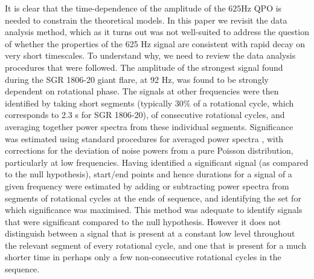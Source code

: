 \documentclass{emulateapj}
\begin{document}
It is clear that the time-dependence of the amplitude of the $625$Hz QPO is needed
to constrain the theoretical models.
In this paper we  revisit the data analysis method, which as it turns out was not well-suited to address the question of whether the properties of the 625 Hz signal are consistent with rapid decay on very short timescales.
To understand why, we need to review the data analysis procedures that were followed. The amplitude of the strongest signal found during the SGR 1806-20 giant flare, at 92 Hz, was found to be strongly dependent on rotational phase. The signals at other frequencies were then identified by taking short segments (typically $30\%$ of a rotational cycle, which corresponds to 2.3 s for SGR 1806-20), of consecutive rotational cycles, and averaging together power spectra from these individual segments. Significance was estimated using standard procedures for averaged power spectra \citep{vanderKlis89}, with corrections for the deviation of noise powers from a pure Poisson distribution, particularly at low frequencies. Having identified a significant signal (as compared to the null hypothesis), start/end points and hence durations for a signal of a given frequency were estimated by adding or subtracting power spectra from segments of rotational cycles at the ends of sequence, and identifying the set for which significance was maximised. This method was adequate to identify signals that were significant compared to the null hypothesis. However it does not distinguish between a signal that is present at a constant low level throughout the relevant segment of every rotational cycle, and one that is present for a much shorter time in perhaps only a few non-consecutive rotational cycles in the sequence.
\end{document}
